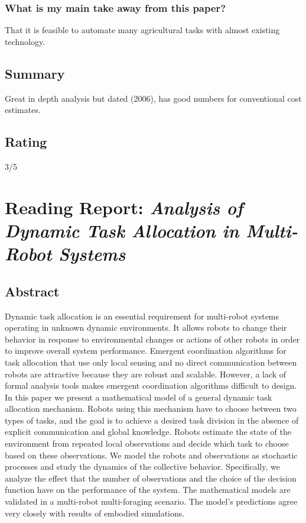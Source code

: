 \subsubsection*{What is my main take away from this paper?}
That it is feasible to automate many agricultural tasks with almost existing technology.

\subsection*{Summary}
Great in depth analysis but dated (2006), has good numbers for conventional cost estimates.
\subsection*{Rating}
3/5


\section{Reading Report: \emph{Analysis of Dynamic Task Allocation in Multi-Robot Systems
}}
\cite{Lerman2006}

\subsection*{Abstract}
Dynamic task allocation is an essential requirement for multi-robot
systems operating in unknown dynamic environments. It allows
robots to change their behavior in response to environmental changes
or actions of other robots in order to improve overall system performance. Emergent coordination algorithms for task allocation that
use only local sensing and no direct communication between robots
are attractive because they are robust and scalable. However, a lack
of formal analysis tools makes emergent coordination algorithms
difficult to design. In this paper we present a mathematical model
of a general dynamic task allocation mechanism. Robots using this
mechanism have to choose between two types of tasks, and the goal
is to achieve a desired task division in the absence of explicit communication and global knowledge. Robots estimate the state of the
environment from repeated local observations and decide which task
to choose based on these observations. We model the robots and observations as stochastic processes and study the dynamics of the collective behavior. Specifically, we analyze the effect that the number
of observations and the choice of the decision function have on the
performance of the system. The mathematical models are validated
in a multi-robot multi-foraging scenario. The model’s predictions
agree very closely with results of embodied simulations.

